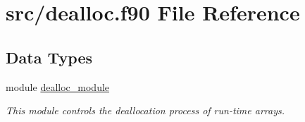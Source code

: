 \hypertarget{dealloc_8f90}{\section{src/dealloc.f90 File Reference}
\label{dealloc_8f90}
}
\subsection*{Data Types}
\begin{DoxyCompactItemize}
\item 
module \hyperlink{classdealloc__module}{dealloc\-\_\-module}
\begin{DoxyCompactList}\small\item\em This module controls the deallocation process of run-\/time arrays. \end{DoxyCompactList}\end{DoxyCompactItemize}
